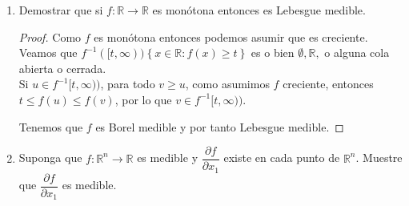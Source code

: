 \documentclass[spanish,12pt,a4paper,openany]{book}
\begin{document}
\begin{enumerate}
\begin{proof}
					Así, podemos ver que si $I$ es una n-celda en $\mathbb{R}^{n}$, entonces $\mu^{*}(I) = \prod_{k=1}^{n} \mu(\lambda(a_{1}^{j}, b_{k}^{j})) = \prod_{k=1}^{n} |\lambda|(b_{k}^{j} - a_{k}^{j}) = |\lambda|^{n} \mu(I).$ De modo que si $\bigcup _{k = 1} ^{\infty} I_{k}$ es un cubrimiento por n-celdas de $M$, entonces $\bigcup _{k = 1} ^{\infty} \lambda I_{k}$ es un cubrimiento por n-celdas de $\lambda M$, e 
					\begin{align*}
						\inf \displaystyle \left\{ \sum_{k=1}^{\infty} \mu^{*} (\lambda I_{k}) : \lambda M \subset \bigcup_{i=1}  \lambda I_{k}^{\infty}\right\}
						&= \inf \displaystyle \left\{ \sum_{k=1}^{\infty} |\lambda|^{n} \mu^{*}(I_{k}) : M \subset \bigcup_{i=1}^{\infty}  I_{k}\right\}\\				
						&= \inf \displaystyle \left\{|\lambda|^{n} \sum_{k=1}^{\infty} \mu^{*}(I_{k}) :  M \subset \bigcup_{i=1}^{\infty} I_{k} \right\}\\
						&= |\lambda|^{n} \inf \displaystyle \left\{\sum_{k=1}^{\infty} \mu^{*}(I_{k}): M \subset \bigcup_{i=1}^{\infty} I_{k}\right\}\\
						&= |\lambda|^{n} \mu^{*}(M)
					\end{align*}
				\end{proof}
			
			\item Demostrar que si $f: \mathbb{R} \rightarrow \mathbb{R}$ es monótona entonces es Lebesgue medible.
				
				\begin{proof}
					Como $f$ es monótona entonces podemos asumir que es creciente. Veamos que $f^{-1}([t, \infty)) \left\{x \in \mathbb{R} : f(x) \geq t \right\}$ es o bien $\emptyset, \mathbb{R},$ o alguna cola abierta o cerrada.\\
					
					Si $u \in f^{-1}[t, \infty))$, para todo $v \geq u$, como asumimos $f$ creciente, entonces $t \leq f(u) \leq f(v)$, por lo que $v \in f^{-1}[t, \infty))$.
					
					Tenemos que $f$ es Borel medible y por tanto Lebesgue medible.
					
				\end{proof}
				
			\item Suponga que $f: \mathbb{R}^{n} \rightarrow \mathbb{R}$ es medible y $\dfrac{\partial f}{\partial x_{1}}$ existe en cada punto de $\mathbb{R} ^{n}$. Muestre que $\dfrac{\partial f}{\partial x_{1}} $ es medible.
			

\end{enumerate}
\end{document}
